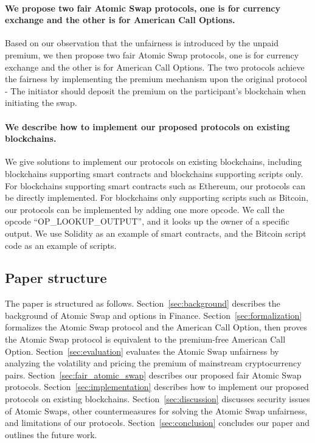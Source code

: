 \paragraph{We propose two fair Atomic Swap protocols, one is for currency exchange and the other is for American Call Options.}
Based on our observation that the unfairness is introduced by the unpaid premium,
we then propose two fair Atomic Swap protocols, one is for currency exchange and the other is for American Call Options.
The two protocols achieve the fairness by implementing the premium mechanism upon the original protocol - The initiator should deposit the premium on the participant's blockchain when initiating the swap.

\paragraph{We describe how to implement our proposed protocols on existing blockchains.}
We give solutions to implement our protocols on existing blockchains, including blockchains supporting smart contracts and blockchains supporting scripts only.
For blockchains supporting smart contracts such as Ethereum, our protocols can be directly implemented.
For blockchains only supporting scripts such as Bitcoin, our protocols can be implemented by adding one more opcode.
We call the opcode ``OP\_LOOKUP\_OUTPUT'', and it looks up the owner of a specific output.
We use Solidity as an example of smart contracts, and the Bitcoin script code as an example of scripts.










\subsection{Paper structure}

The paper is structured as follows.
Section~\ref{sec:background} describes the background of Atomic Swap and options in Finance.
Section~\ref{sec:formalization} formalizes the Atomic Swap protocol and the American Call Option, then proves the Atomic Swap protocol is equivalent to the premium-free American Call Option.
Section~\ref{sec:evaluation} evaluates the Atomic Swap unfairness by analyzing the volatility and pricing the premium of mainstream cryptocurrency pairs.
Section~\ref{sec:fair_atomic_swap} describes our proposed fair Atomic Swap protocols.
Section~\ref{sec:implementation} describes how to implement our proposed protocols on existing blockchains.
Section~\ref{sec:discussion} discusses security issues of Atomic Swaps, other countermeasures for solving the Atomic Swap unfairness, and limitations of our protocols.
Section~\ref{sec:conclusion} concludes our paper and outlines the future work.
